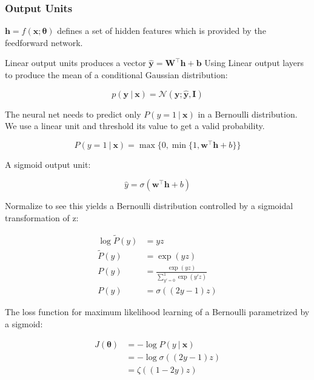 \subsubsection{Output Units}
$\bm{h} = f( \bm{x}; \bm{\theta})$ defines a set of hidden features which is provided by the feedforward network.

Linear output units produces a vector $\hat{\bm{y}} = \bm{W} ^ \top \bm{h} + \bm{b}$
Using Linear output layers to produce the mean of a conditional Gaussian distribution:

  \begin{equation} \tag{6.17}
   \label{eq_6_17}
   p(\bm{y}\ |\ \bm{x}) = \mathcal{N}(\bm{y}; \hat{\bm{y}}, \bm{I})
  \end{equation}

The neural net needs to predict only $P(y=1\ |\ \bm{x})$ in a Bernoulli distribution.
We use a linear unit and threshold its value to get a valid probability.

  \begin{equation} \tag{6.18}
   \label{eq_6_18}
   P(y = 1\ |\ \bm{x}) = \max \{ 0, \min \{ 1, \bm{w} ^ \top \bm{h} + b \} \}
  \end{equation}
  
A sigmoid output unit:

  \begin{equation} \tag{6.19}
    \label{eq_6_19}
    \hat{y} = \sigma( \bm{w} ^ \top \bm{h} + b)
  \end{equation}
  
Normalize to see this yields a Bernoulli distribution controlled by a sigmoidal transformation of z:

  \setcounter{equation}{20}
  \begin{align} \tag{6.20}
   \label{eq_6_20}
    \log \tilde{P}(y)& =yz\\
    \tilde{P}(y)& = \exp(yz)\\
    P(y)& =\frac{\exp(yz)}{\sum _ {y'=0} ^ {1} \exp(y'z) }\\
    P(y)& =\sigma( (2y-1)z )
  \end{align}
  
The loss function for maximum likelihood learning of a Bernoulli parametrized by a sigmoid:

  \setcounter{equation}{24}
  \begin{align} \tag{6.24}
   \label{eq_6_24}
    J(\bm{\theta})& = - \log P(y\ |\ \bm{x})\\
    & = - \log \sigma( (2y-1)z )\\
    & = \zeta( (1-2y)z )
  \end{align}

